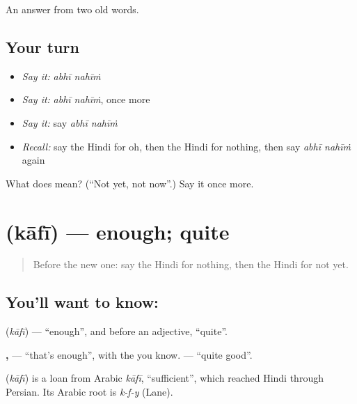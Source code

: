 \begin{grammarlens}[title={What you've built}]
An answer from two old words.
\end{grammarlens}

\subsection*{Your turn}
\begin{itemize}
\raggedright
  \item \emph{Say it:} \emph{abhī nahīṁ}
  \item \emph{Say it:} \emph{abhī nahīṁ}, once more
  \item \emph{Say it:} say \emph{abhī nahīṁ}
  \item \emph{Recall:} say the Hindi for oh, then the Hindi for nothing, then say \emph{abhī nahīṁ} again
\end{itemize}

\begin{tcolorbox}[breakable,colback=teal!4,colframe=teal!35!black,title={Before you move on}]
What does   mean? (\textquotedblleft{}Not yet, not now\textquotedblright{}.) Say it once more.
\end{tcolorbox}
\section[\texorpdfstring{\hi{काफ़ी} (kāfī)}{काफ़ी (kāfī)}]{ (kāfī) — enough; quite}

\label{lesson:HI-C113-kafi}



\begin{quote}
Before the new one: say the Hindi for nothing, then the Hindi for not yet.
\end{quote}

\subsection*{You'll want to know: }
\textbf{} (\emph{kāfī}) — \textquotedblleft{}enough\textquotedblright{}, and before an adjective, \textquotedblleft{}quite\textquotedblright{}.

\textbf{,  } — \textquotedblleft{}that's enough\textquotedblright{}, with the \textbf{} you know. \textbf{ } — \textquotedblleft{}quite good\textquotedblright{}.

\begin{cousinweb}
\textbf{} (\emph{kāfī}) is a loan from Arabic \emph{kāfī}, \textquotedblleft{}sufficient\textquotedblright{}, which reached Hindi through Persian. Its Arabic root is \emph{k-f-y} (Lane).
\end{cousinweb}

